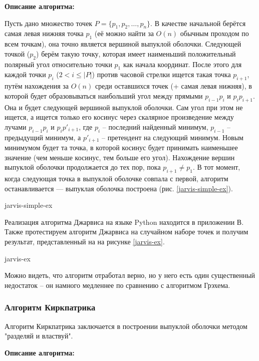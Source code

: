 {\bf Описание алгоритма:}

Пусть дано множество точек $P = \{p_1, p_2, \ldots, p_n\}$. В качестве
начальной берётся самая левая нижняя точка $p_1$ (её можно найти за
$O(n)$ обычным проходом по всем точкам), она точно является вершиной
выпуклой оболочки. Следующей точкой ($p_2$) берём такую точку, 
которая имеет наименьший положительный полярный угол относительно точки
$p_1$ как начала координат. После этого для каждой точки $p_i$ 
($2 < i \leq |P|$) против часовой стрелки ищется такая точка $p_{i+1}$,
путём нахождения за $O(n)$ среди оставшихся точек 
(+ самая левая нижняя),
в которой будет образовываться наибольший угол между прямыми 
$p_{i-1}p_i$ и $p_ip_{i+1}$. Она и будет следующей вершиной выпуклой
оболочки. Сам угол при этом не ищется, а ищется только его косинус 
через скалярное произведение между лучами $p_{i-1}p_i$ и 
$p_ip'_{i+1}$, где $p_i$ -- последний найденный минимум, $p_{i-1}$ -- 
предыдущий минимум, а $p'_{i+1}$ -- претендент на следующий минимум.
Новым минимумом будет та точка, в которой косинус будет принимать
наименьшее значение (чем меньше косинус, тем больше его угол).
Нахождение вершин выпуклой оболочки продолжается до тех пор, пока 
$p_{i+1} \neq p_1$. В тот момент, когда следующая точка в выпуклой
оболочке совпала с первой, алгоритм останавливается — выпуклая оболочка
построена (рис. \ref{jarvis-simple-ex}).

{jarvis-simple-ex}

Реализация алгоритма Джарвиса на языке Python находится в приложении В.
Также протестируем алгоритм Джарвиса на случайном наборе точек и
получим результат, представленный на на рисунке \ref{jarvis-ex}.

{jarvis-ex}

Можно видеть, что алгоритм отработал верно, но у него есть один 
существенный недостаток -- он намного медленнее по сравнению с 
алгоритмом Грэхема.

\subsubsection{Алгоритм Киркпатрика}

Алгоритм Киркпатрика \cite{kirkpatrick} заключается в построении
выпуклой оболочки методом "разделяй и властвуй".

{\bf Описание алгоритма:}

